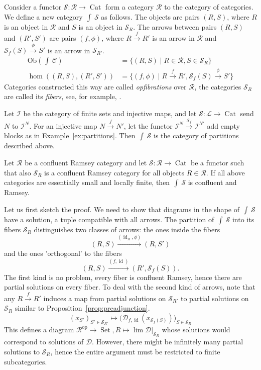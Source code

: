 \documentclass[preprint,12pt]{elsarticle}
\newcommand{\cat}[1]{\mathcal{#1}}
\newcommand{\op}{^{\mathop{op}}}
\DeclareMathOperator{\Set}{Set}
\DeclareMathOperator{\Cat}{Cat}
\DeclareMathOperator{\Elts}{\int\!}
\DeclareMathOperator{\id}{id}
\begin{document}
\begin{defin}
    Consider a functor $\cat S: \cat R\to \Cat $ form a category $\cat R$ to the category of categories. We define a new category $\Elts\cat S$ as follows. The objects are pairs $(R,S)$, where $R$ is an object in $\cat R$ and $S$ is an object in $\cat S_R$. The arrows between pairs $(R,S)$ and $(R',S')$ are pairs $(f,\phi)$, where $R\xrightarrow{f}R'$ is an arrow in $\cat R$ and $\cat S_f(S)\xrightarrow{\phi} S'$ is an arrow in $\cat S_{R'}$.
    \begin{align*}
        \mathrm{Ob}(\textstyle\Elts\cat C) &= \{ ( R,S) \mid R\in\cat R, S\in\cat S_R\} \\
        \hom((R,S),(R',S')) &= \{ (f, \phi)\mid R\xrightarrow{f}R', \cat S_f(S)\xrightarrow{\phi} S' \}
    \end{align*}
    Categories constructed this way are called \emph{opfibrations} over $\cat R$, the categories $\cat S_R$ are called its \emph{fibers}, see, for example, \cite{LoregianRiehl2020fibrations}.
\end{defin}

\begin{exam}
    Let $\cat I$ be the category of finite sets and injective maps, and let $\cat S:\cat L\to\Cat$ send $N$ to $\cat I^N$. For an injective map $N\xrightarrow{f}N'$, let the functor $\cat I^N\xrightarrow{\cat S_f}\cat I^{N'}$ add empty blocks as in Example~\ref{ex:partitions}. Then $\Elts\cat S$ is the category of partitions described above.
\end{exam}

\begin{thm}
\label{thm:opfibrations}
    Let $\cat R$ be a confluent Ramsey category and let $\cat S:\cat R\to \Cat$ be a functor such that also $\cat S_R$ is a confluent Ramsey category for all objects $R\in \cat R$. If all above categories are essentially small and locally finite, then $\Elts\cat S$ is confluent and Ramsey.
\end{thm}

Let us first sketch the proof. We need to show that diagrams in the shape of $\Elts\cat S$ have a solution, a tuple compatible with all arrows. The partition of $\Elts\cat S$ into its fibers $\cat S_R$ distinguishes two classes of arrows: the ones inside the fibers 
$$(R,S)\xrightarrow{(\id_R,\phi)}(R,S')$$ 
and the ones 'orthogonal' to the fibers 
$$(R,S)\xrightarrow{(f,\id)} (R', \cat S_f(S)).$$ %
The first kind is no problem, every fiber is confluent Ramsey, hence there are partial solutions on every fiber. To deal with the second kind of arrows, note that any $R\xrightarrow{f}R'$ induces a map from partial solutions on $\cat S_{R'}$ to partial solutions on $\cat S_R$ similar to Proposition~\ref{prop:preadjunction}.
$$
    (x_{S'})_{S'\in\cat S_{R'}}\mapsto 
    \big(\cat D_{f,\id} (x_{\cat S_f(S)}) \big)_{S\in\cat S_R}
$$
This defines a diagram $\cat R\op\to \Set,R\mapsto \lim \cat D|_{\cat S_R}$ whose solutions would correspond to solutions of $\cat D$. However, there might be infinitely many partial solutions to $\cat S_R$, hence the entire argument must be restricted to finite subcategories.
\end{document}
